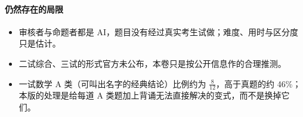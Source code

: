 

\paragraph{仍然存在的局限}
\begin{itemize}
  \item 审核者与命题者都是 AI，题目没有经过真实考生试做；难度、用时与区分度只是估计。
  \item 二试综合、三试的形式官方未公布，本卷只是按公开信息作的合理推测。
  \item 一试数学 A 类（可叫出名字的经典结论）比例约为 $\frac8{12}$，高于真题的约 46\%；本版的处理是给每道 A 类题加上背诵无法直接解决的变式，而不是换掉它们。
\end{itemize}
